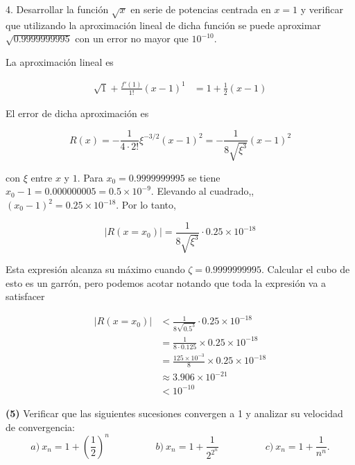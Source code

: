 \documentclass[12pt]{article}
\begin{document}
\pagebreak 

\begin{myframe}
    4. Desarrollar la función $\sqrt{x}$ en serie de potencias centrada en $x = 1$ y verificar que utilizando la aproximación lineal de dicha función se puede aproximar $\sqrt{0.9999999995}$ con un error no mayor que $10^{-10}$.
\end{myframe}

La aproximación lineal es 

\begin{align*}
    \sqrt{1} + \frac{ f'(1) }{1!}(x-1)^1 
    &= 1 + \frac{1}{2}(x-1)
\end{align*}

El error de dicha aproximación es 

\begin{equation*}
    R(x) = -\frac{1}{4 \cdot 2!}\xi^{-3 / 2}(x-1)^2 = -\frac{1}{8\sqrt{\xi^3}
    }(x-1)^2
\end{equation*}

con $\xi$ entre $x$ y $1$. Para $x_0 = 0.9999999995$ se tiene $x_0-1 = 0.000000005 =
0.5 \times 10^{-9}$. Elevando al cuadrado,, $(x_0-1)^2 = 0.25 \times 10^{-18}$.
Por lo tanto, 

\begin{equation*}
    |R(x = x_0)| = \frac{1}{8 \sqrt{\xi^3} } \cdot 0.25 \times 10^{-18}
\end{equation*}

Esta expresión alcanza su máximo cuando $\zeta = 0.9999999995$. Calcular el cubo
de esto es un garrón, pero podemos acotar notando que toda la expresión va a
satisfacer


\begin{align*}
    |R(x = x_0)| 
    &< \frac{1}{8 \sqrt{0.5^3} } \cdot 0.25 \times 10^{-18}  \\ 
    &= \frac{1}{8 \cdot 0.125} \times 0.25 \times 10^{-18} \\ 
    &= \frac{125 \times 10^{-3}}{8} \times 0.25 \times 10^{-18} \\ 
    &\approx 3.906 \times 10^{-21} \\ 
    &< 10^{-10}
\end{align*}

\pagebreak 

\begin{myframe}
 \textbf{(5)} Verificar que las siguientes sucesiones convergen a 1 y analizar su velocidad de convergencia:
\[
a) \ x_n = 1 + \left( \frac{1}{2} \right)^n \hspace{2cm} b) \ x_n = 1 + \frac{1}{2^{2^n}} \hspace{2cm} c) \ x_n = 1 + \frac{1}{n^n}.
\]   
\end{myframe}
\end{document}
